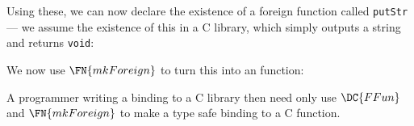 Using these, we can now declare the existence of a foreign function
called \texttt{putStr} --- we assume the existence of this in a C
library, which simply outputs a string and returns \texttt{void}:


\noindent
We now use $\FN{mkForeign}$ to turn this into an \Idris{} function:


A programmer writing a binding to a C library then need only use
$\DC{FFun}$ and $\FN{mkForeign}$ to make a type safe \Idris{} binding
to a C function.
